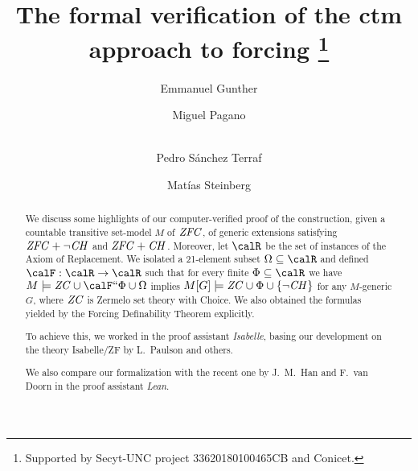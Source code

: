 \documentclass[runningheads]{llncs}
\begin{document}
%
\title{The formal verification of the ctm approach to forcing%
  \thanks{Supported by Secyt-UNC project 33620180100465CB and Conicet.}%
}
%
%
\author{Emmanuel Gunther \and
Miguel Pagano \and \\
Pedro Sánchez Terraf%
\and
Matías Steinberg
}
%
%
%
\maketitle              %
%
\begin{abstract}
  We discuss some highlights of our computer-verified
  proof of the construction, given a countable transitive set-model $M$
  of $\mathit{ZFC}$, of generic extensions  satisfying $\mathit{ZFC}+\neg\mathit{CH}$ and $\mathit{ZFC}+\mathit{CH}$.
  Moreover, let $\calR$ be the set of instances of the Axiom of
  Replacement. We isolated a 21-element subset $\Omega\sbq\calR$ and
  defined $\calF:\calR\to\calR$
  such that for every finite $\Phi\sbq\calR$
  we have
  $M\models \ZC \cup \calF\dimg\Phi \cup \Omega$ implies
  $M[G]\models \mathit{ZC} \cup \Phi \cup \{ \neg \mathit{CH} \}$ for any $M$-generic $G$, where $\mathit{ZC}$ is
  Zermelo set theory with Choice.
  We also obtained the formulas yielded by the Forcing Definability Theorem
  explicitly.

  To achieve this, we worked in the proof assistant \emph{Isabelle},
  basing our development on the theory Isabelle/ZF by L.~Paulson and
  others.


  We also compare our formalization with the recent one by J.~M.~Han and F.~van Doorn in the proof assistant \emph{Lean}.

\end{abstract}
%
%
%

 
\end{document}
